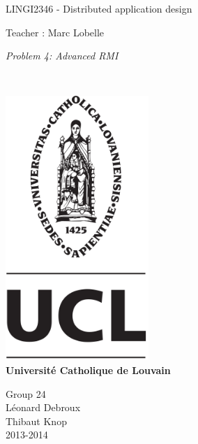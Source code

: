 \documentclass{article}
\begin{document}
\begin{titlepage}
    \begin{center}
        {\huge LINGI2346 - Distributed application design}\\
        \vspace{0.4cm}
        
        {\Large {Teacher : Marc Lobelle}}\\
        \vspace{0.6cm}
        
        {\Large \textit{Problem 4: Advanced RMI}}\\
        \vspace{1.2cm}

        \texttt{}\\
        \vspace{0.2cm}

        \includegraphics[height=10cm]{pageGarde.png}\\
        \vspace{0.1cm}
        {\Large \textbf{Universit\'e Catholique de Louvain}}
        \vspace{0.3cm}

        \vspace{2cm}
        Group 24\\
        \vspace{0.3cm}
        Léonard Debroux\\
        Thibaut Knop\\
        \vspace{0.4cm}
        2013-2014\\
    \end{center}
\end{titlepage}
\end{document}
